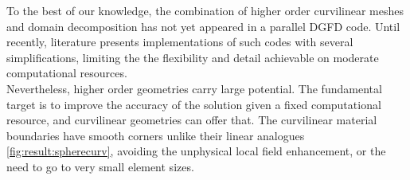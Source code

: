 \noindent
To the best of our knowledge, the combination of higher order curvilinear meshes and domain decomposition has not yet appeared in a parallel DGFD code. Until recently, literature presents implementations of such codes with several simplifications, limiting the the flexibility and detail achievable on moderate computational resources. \\

\noindent
Nevertheless, higher order geometries carry large potential. The fundamental target is to improve the accuracy of the solution given a fixed computational resource, and curvilinear geometries can offer that. The curvilinear material boundaries have smooth corners unlike their linear analogues \cref{fig:result:spherecurv}, avoiding the unphysical local field enhancement, or the need to go to very small element sizes. \\

